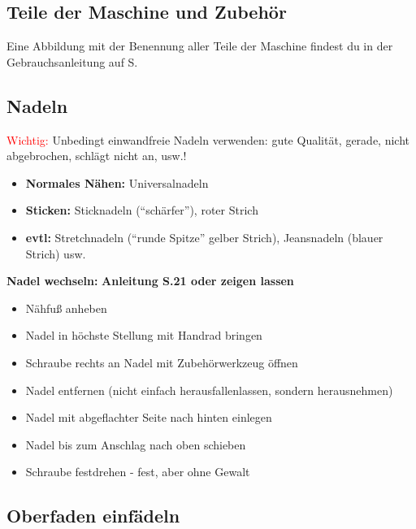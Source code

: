 \documentclass{\basedir/fablab-document}
\begin{document}
\subsection{Teile der Maschine und Zubehör}

Eine Abbildung mit der Benennung aller Teile der Maschine findest du in der Gebrauchsanleitung auf S. %


\subsection{Nadeln}
\textcolor{red}{Wichtig:} Unbedingt einwandfreie Nadeln verwenden: gute Qualität, gerade, nicht abgebrochen, schlägt nicht an, usw.!
\begin{itemize}
 \item \textbf{Normales Nähen:} Universalnadeln
 \item \textbf{Sticken:} Sticknadeln (“schärfer”), roter Strich
 \item \textbf{evtl:} Stretchnadeln (“runde Spitze” gelber Strich), Jeansnadeln (blauer Strich) usw.
\end{itemize}

\vspace{2em}

\textbf{Nadel wechseln:}
\newline \textbf{Anleitung S.21 oder zeigen lassen}
\begin{itemize}
	\item Nähfuß anheben
	\item Nadel in höchste Stellung mit Handrad bringen
	\item Schraube rechts an Nadel mit Zubehörwerkzeug öffnen
	\item Nadel entfernen (nicht einfach herausfallenlassen, sondern herausnehmen)
	\item Nadel mit abgeflachter Seite nach hinten einlegen
	\item Nadel bis zum Anschlag nach oben schieben
	\item Schraube festdrehen -  fest, aber ohne Gewalt
\end{itemize}

\vspace{2em}

\subsection{Oberfaden einfädeln}
\end{document}
